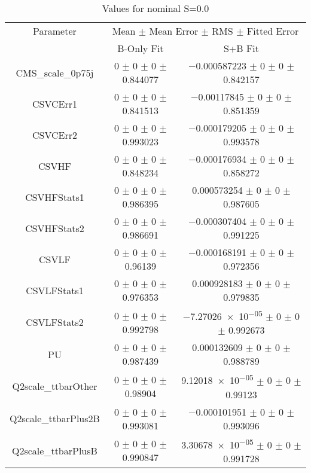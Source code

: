 \begin{table}
\centering
\caption{Values for nominal S=0.0}
\begin{tabular}{ccc}
\toprule
Parameter & \multicolumn{2}{c}{Mean $\pm$ Mean Error $\pm$ RMS $\pm$ Fitted Error}\\
 & B-Only Fit & S+B Fit\\
\midrule
CMS\_scale\_0p75j & \num{0} $\pm$ \num{0} $\pm$ \num{0} $\pm$ \num{0.844077} & \num{-0.000587223} $\pm$ \num{0} $\pm$ \num{0} $\pm$ \num{0.842157}\\
CSVCErr1 & \num{0} $\pm$ \num{0} $\pm$ \num{0} $\pm$ \num{0.841513} & \num{-0.00117845} $\pm$ \num{0} $\pm$ \num{0} $\pm$ \num{0.851359}\\
CSVCErr2 & \num{0} $\pm$ \num{0} $\pm$ \num{0} $\pm$ \num{0.993023} & \num{-0.000179205} $\pm$ \num{0} $\pm$ \num{0} $\pm$ \num{0.993578}\\
CSVHF & \num{0} $\pm$ \num{0} $\pm$ \num{0} $\pm$ \num{0.848234} & \num{-0.000176934} $\pm$ \num{0} $\pm$ \num{0} $\pm$ \num{0.858272}\\
CSVHFStats1 & \num{0} $\pm$ \num{0} $\pm$ \num{0} $\pm$ \num{0.986395} & \num{0.000573254} $\pm$ \num{0} $\pm$ \num{0} $\pm$ \num{0.987605}\\
CSVHFStats2 & \num{0} $\pm$ \num{0} $\pm$ \num{0} $\pm$ \num{0.986691} & \num{-0.000307404} $\pm$ \num{0} $\pm$ \num{0} $\pm$ \num{0.991225}\\
CSVLF & \num{0} $\pm$ \num{0} $\pm$ \num{0} $\pm$ \num{0.96139} & \num{-0.000168191} $\pm$ \num{0} $\pm$ \num{0} $\pm$ \num{0.972356}\\
CSVLFStats1 & \num{0} $\pm$ \num{0} $\pm$ \num{0} $\pm$ \num{0.976353} & \num{0.000928183} $\pm$ \num{0} $\pm$ \num{0} $\pm$ \num{0.979835}\\
CSVLFStats2 & \num{0} $\pm$ \num{0} $\pm$ \num{0} $\pm$ \num{0.992798} & \num{-7.27026e-05} $\pm$ \num{0} $\pm$ \num{0} $\pm$ \num{0.992673}\\
PU & \num{0} $\pm$ \num{0} $\pm$ \num{0} $\pm$ \num{0.987439} & \num{0.000132609} $\pm$ \num{0} $\pm$ \num{0} $\pm$ \num{0.988789}\\
Q2scale\_ttbarOther & \num{0} $\pm$ \num{0} $\pm$ \num{0} $\pm$ \num{0.98904} & \num{9.12018e-05} $\pm$ \num{0} $\pm$ \num{0} $\pm$ \num{0.99123}\\
Q2scale\_ttbarPlus2B & \num{0} $\pm$ \num{0} $\pm$ \num{0} $\pm$ \num{0.993081} & \num{-0.000101951} $\pm$ \num{0} $\pm$ \num{0} $\pm$ \num{0.993096}\\
Q2scale\_ttbarPlusB & \num{0} $\pm$ \num{0} $\pm$ \num{0} $\pm$ \num{0.990847} & \num{3.30678e-05} $\pm$ \num{0} $\pm$ \num{0} $\pm$ \num{0.991728}\\

\end{tabular}
\end{table}
